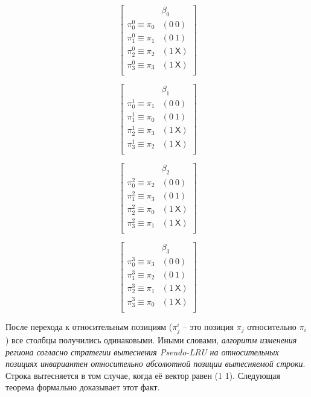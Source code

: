 \documentclass[14pt]{extreport}
\newcommand{\PseudoLRU}{\textsf{Pseudo-LRU}\xspace}
\begin{document}
\parbox{0.24\textwidth}{
$$ \left[
  \begin{array}{c|c}
          & \beta_0 \\ \hline
    \pi^0_0 \equiv \pi_0 & (0~0) \\
    \pi^0_1 \equiv \pi_1 & (0~1) \\
    \pi^0_2 \equiv \pi_2 & (1~\textsf{X}) \\
    \pi^0_3 \equiv \pi_3 & (1~\textsf{X}) \\
  \end{array}
\right]
$$
}\parbox{0.24\textwidth}{
$$ \left[
  \begin{array}{c|c}
          & \beta_1 \\ \hline
    \pi^1_0 \equiv \pi_1 & (0~0) \\
    \pi^1_1 \equiv \pi_0 & (0~1) \\
    \pi^1_2 \equiv \pi_3 & (1~\textsf{X}) \\
    \pi^1_3 \equiv \pi_2 & (1~\textsf{X}) \\
  \end{array}
\right]
$$
}\parbox{0.24\textwidth}{
$$ \left[
  \begin{array}{c|c}
          & \beta_2 \\ \hline
    \pi^2_0 \equiv \pi_2 & (0~0) \\
    \pi^2_1 \equiv \pi_3 & (0~1) \\
    \pi^2_2 \equiv \pi_0 & (1~\textsf{X}) \\
    \pi^2_3 \equiv \pi_1 & (1~\textsf{X}) \\
  \end{array}
\right]
$$
}\parbox{0.24\textwidth}{
$$ \left[
  \begin{array}{c|c}
          & \beta_3 \\ \hline
    \pi^3_0 \equiv \pi_3 & (0~0) \\
    \pi^3_1 \equiv \pi_2 & (0~1) \\
    \pi^3_2 \equiv \pi_1 & (1~\textsf{X}) \\
    \pi^3_3 \equiv \pi_0 & (1~\textsf{X}) \\
  \end{array}
\right]
$$
}

После перехода к относительным позициям ($\pi^i_j$ -- это позиция
$\pi_j$ относительно $\pi_i$) все столбцы получились одинаковыми.
Иными словами, \emph{алгоритм изменения региона согласно стратегии
вытеснения \PseudoLRU на относительных позициях инвариантен
относительно абсолютной позиции вытесняемой строки}. Строка вытесняется в
том случае, когда её вектор равен (1 1). Следующая теорема
формально доказывает этот факт.
\end{document}
